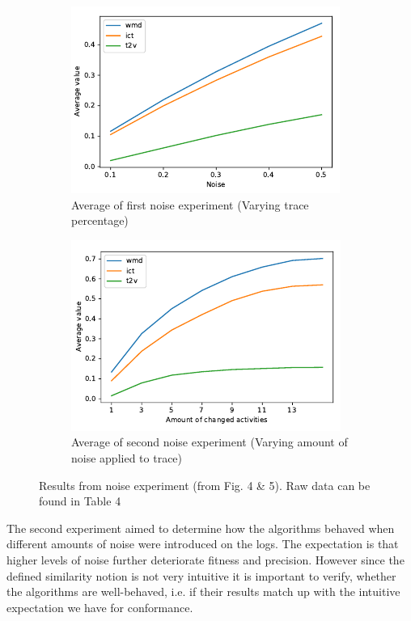 \documentclass[runningheads]{template/llncs}
\begin{document}
\begin{figure}
	\centering
	\begin{subfigure}[b]{0.49\textwidth}
		\centering
		\includegraphics[width=\textwidth]{figures/noise-first}
		\caption{Average of first noise experiment (Varying trace percentage) }
		\label{fig:noise-first}
	\end{subfigure}
	\hfill
	\begin{subfigure}[b]{0.49\textwidth}
		\centering
		\includegraphics[width=\textwidth]{figures/noise-second}
		\caption{Average of second noise experiment (Varying amount of noise applied to trace)}
		\label{fig:noise-second}
	\end{subfigure}
\caption{Results from noise experiment (from \cite{PBWe20} Fig. 4 \& 5). Raw data can be found in \cite{PBWe20} Table 4}
\label{fig:noise}
\end{figure}
The second experiment aimed to determine how the algorithms behaved when different amounts of noise were introduced on the logs.
The expectation is that higher levels of noise further deteriorate fitness and precision. 
However since the defined similarity notion is not very intuitive it is important to verify, whether the algorithms are well-behaved, i.e. if their results match up with the intuitive expectation we have for conformance.
\end{document}
